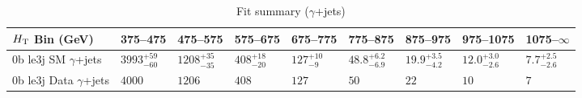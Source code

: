 \documentclass[8pt]{article}
\def\scalht{\mbox{$H_{\rm{T}}$}\xspace}
\newcommand\T{\rule{0pt}{2.6ex}}
\begin{document}
\begin{table}[ht!]
\caption{Fit summary ($\gamma$+jets)}
\label{tab:ensemble-summary}
\centering
\begin{tabular}{ lllllllll }

\hline
\scalht Bin (GeV)       & 375--475                       & 475--575                       & 575--675                       & 675--775                       & 775--875                       & 875--975                       & 975--1075                      & 1075--$\infty$                 \\ [1.000000ex]
\hline
0b le3j SM $\gamma$+jets\T & $3993^{+59}_{-60}$             & $1208^{+35}_{-35}$             & $408^{+18}_{-20}$              & $127^{+10}_{-9}$               & $48.8^{+6.2}_{-6.9}$           & $19.9^{+3.5}_{-4.2}$           & $12.0^{+3.0}_{-2.6}$           & $7.7^{+2.5}_{-2.6}$            \\ 
0b le3j Data $\gamma$+jets\T & $4000$                         & $1206$                         & $408$                          & $127$                          & $50$                           & $22$                           & $10$                           & $7$                            \\ 
\hline

\end{tabular}
\end{table}
\end{document}
